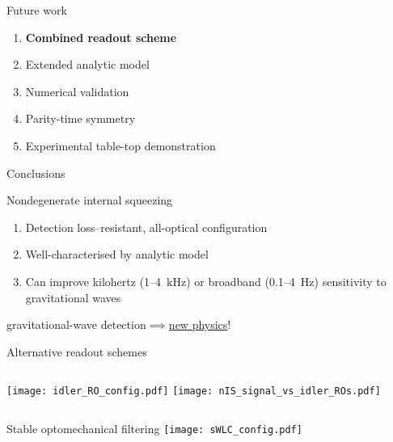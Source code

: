 \documentclass[12pt,xcolor=dvipsnames]{beamer}
\begin{document}
\begin{frame}{Future work}
	\begin{enumerate}
	\item \textbf{Combined readout scheme} %
	\item Extended analytic model %
	\item Numerical validation %
	\item Parity-time symmetry
	\item Experimental table-top demonstration 
	\end{enumerate}
\end{frame}

\begin{frame}{Conclusions}
\begin{block}{Nondegenerate internal squeezing}
\begin{enumerate}
\item Detection loss--resistant, all-optical configuration
\item Well-characterised by analytic model
\item Can improve kilohertz (1--4~kHz) or broadband (0.1--4~Hz) sensitivity to gravitational waves 
\end{enumerate}
\end{block}
\centering
\vspace{0.5cm}
{\large gravitational-wave detection$\implies$\underline{new physics}!}
\end{frame}





\begin{frame}[noframenumbering]{Alternative readout schemes}
\begin{columns}
\texttt{[image: idler\_RO\_config.pdf]}
\centering
{}
\centering
\texttt{[image: nIS\_signal\_vs\_idler\_ROs.pdf]}
\end{columns}
\end{frame}

\begin{frame}[noframenumbering]{Stable optomechanical filtering}
\centering
\texttt{[image: sWLC\_config.pdf]}
\end{frame}
\end{document}
